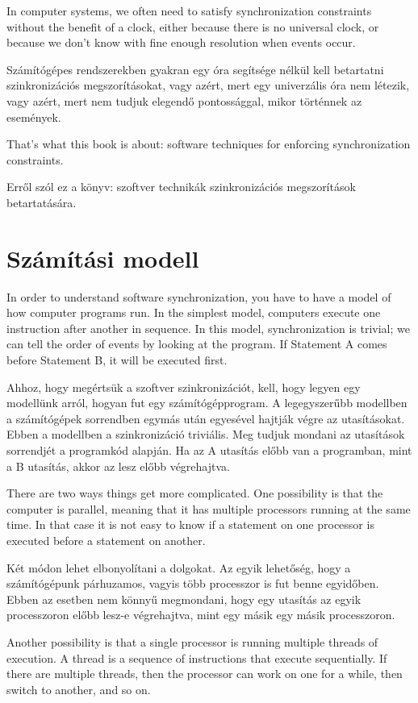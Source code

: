 \documentclass{book}
\begin{document}
In computer systems, we often need to satisfy synchronization
constraints without the benefit of a clock, either because there
is no universal clock, or because we don't know with fine enough
resolution when events occur.

Számítógépes rendszerekben gyakran egy óra segítsége nélkül kell
betartatni szinkronizációs megszorításokat, vagy azért, mert
egy univerzális óra nem létezik, vagy azért, mert nem tudjuk
elegendő pontossággal, mikor történnek az események.

That's what this book is about: software techniques for enforcing
synchronization constraints.

Erről szól ez a könyv: szoftver technikák szinkronizációs megszorítások
betartatására.

\section{Számítási modell}

In order to understand software synchronization, you have to
have a model of how computer programs run.  In the simplest
model, computers execute one instruction after another in
sequence.  In this model, synchronization is trivial; we can
tell the order of events by looking at the program.  If Statement
A comes before Statement B, it will be executed first.

Ahhoz, hogy megértsük a szoftver szinkronizációt, kell, hogy legyen
egy modellünk arról, hogyan fut egy számítógépprogram. A legegyszerűbb
modellben a számítógépek sorrendben egymás után egyesével
hajtják végre az utasításokat. Ebben a modellben a szinkronizáció
triviális. Meg tudjuk mondani az utasítások sorrendjét a programkód
alapján. Ha az A utasítás előbb van a programban, mint a B utasítás,
akkor az lesz előbb végrehajtva.

There are two ways things get more complicated.  One possibility
is that the computer is parallel, meaning that it has multiple
processors running at the same time.  In that case it is not easy
to know if a statement on one processor is executed before a
statement on another.

Két módon lehet elbonyolítani a dolgokat. Az egyik lehetőség, hogy
a számítógépunk párhuzamos, vagyis több processzor is fut benne
egyidőben. Ebben az esetben nem könnyű megmondani, hogy egy
utasítás az egyik processzoron előbb lesz-e végrehajtva, mint
egy másik egy másik processzoron.

Another possibility is that a single processor is running multiple
threads of execution.  A thread is a sequence of instructions
that execute sequentially.  If there are multiple threads, then
the processor can work on one for a while, then switch to
another, and so on.
\end{document}

